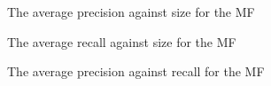 \documentclass{article}
\begin{document}
\begin{figure}
\centering
{}
\caption{The average precision against size for the MF} 
\label{Q381}
\end{figure}

\begin{figure}
\centering
{}
\caption{The average recall against size for the MF} 
\label{Q382}
\end{figure}

\begin{figure}
\centering
{}
\caption{The average precision against recall for the MF} 
\label{Q383}
\end{figure}
\end{document}
